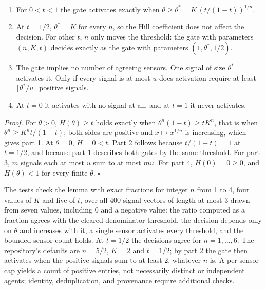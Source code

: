 \documentclass[
  11pt,
]{article}
\providecommand{\tightlist}{%
  \setlength{\itemsep}{0pt}\setlength{\parskip}{0pt}}
\begin{document}
\begin{enumerate}
\def\labelenumi{\arabic{enumi}.}
\tightlist
\item
  For \(0 < t < 1\) the gate activates exactly when
  \(\theta \geq \theta^* = K \,\allowbreak  (t / (1 - t))^{1/n}\).
\item
  At \(t = 1/2\), \(\theta^* = K\) for every \(n\), so the Hill
  coefficient does not affect the decision. For other \(t\), \(n\) only
  moves the threshold: the gate with parameters
  \((n,\allowbreak  K,\allowbreak  t)\) decides exactly as the gate with
  parameters \((1,\allowbreak  \theta^*,\allowbreak  1/2)\).
\item
  The gate implies no number of agreeing sensors. One signal of size
  \(\theta^*\) activates it. Only if every signal is at most \(u\) does
  activation require at least \(\lceil \theta^* / u \rceil\) positive
  signals.
\item
  At \(t = 0\) it activates with no signal at all, and at \(t = 1\) it
  never activates.
\end{enumerate}

\emph{Proof.} For \(\theta > 0\), \(H(\theta) \geq t\) holds exactly
when \(\theta^n (1 - t) \geq t K^n\), that is when
\(\theta^n \geq K^n t / (1 - t)\); both sides are positive and
\(x \mapsto x^{1/n}\) is increasing, which gives part 1. At
\(\theta = 0\), \(H = 0 < t\). Part 2 follows because
\(t / (1 - t) = 1\) at \(t = 1/2\), and because part 1 describes both
gates by the same threshold. For part 3, \(m\) signals each at most
\(u\) sum to at most \(mu\). For part 4, \(H(0) = 0 \geq 0\), and
\(H(\theta) < 1\) for every finite \(\theta\). \(\square\)

The tests check the lemma with exact fractions for integer \(n\) from 1
to 4, four values of \(K\) and five of \(t\), over all 400 signal
vectors of length at most 3 drawn from seven values, including 0 and a
negative value: the ratio computed as a fraction agrees with the
cleared-denominator threshold, the decision depends only on \(\theta\)
and increases with it, a single sensor activates every threshold, and
the bounded-sensor count holds. At \(t = 1/2\) the decisions agree for
\(n = 1,\allowbreak  \ldots,\allowbreak  6\). The repository's defaults
are \(n = 5/2\), \(K = 2\) and \(t = 1/2\); by part 2 the gate then
activates when the positive signals sum to at least 2, whatever \(n\)
is. A per-sensor cap yields a count of positive entries, not necessarily
distinct or independent agents; identity, deduplication, and provenance
require additional checks.
\end{document}

